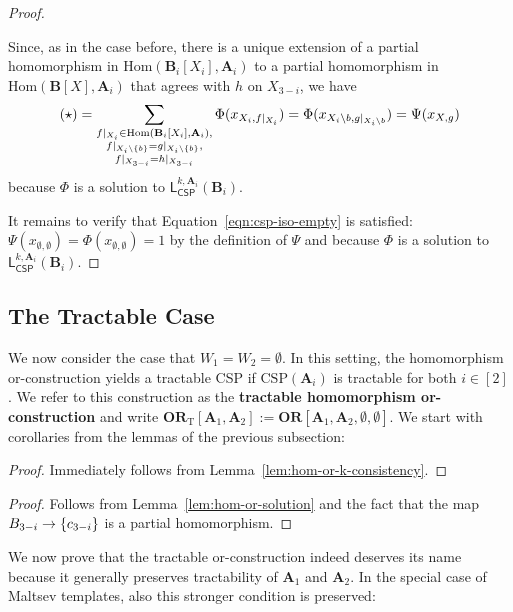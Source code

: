 \documentclass[a4paper,english, thm-restate]{lipics-v2021}
\newcommand{\defining}[1]{\textbf{#1}}
\DeclarePairedDelimiter\set{\lbrace}{\rbrace}
\newcommand{\StructA}{\mathbf{A}}
\newcommand{\StructB}{\mathbf{B}}
\newcommand{\CSP}[1]{\mathrm{CSP}(#1)}
\newcommand{\restrict}[2]{#1|_{#2}}
\newcommand{\Hom}[2]{\mathrm{Hom}(#1,#2)}
\newcommand{\leqs}{\mathsf{L}}
\newcommand{\cspiso}[3]{\leqs^{#1,#2}_{\mathsf{CSP}}(#3)}
\newcommand{\ORparam}[1]{\mathbf{OR}[#1]}
\newcommand{\ORT}[1]{\mathbf{OR}_\text{T}[#1]}
\begin{document}
\begin{proof}
\begin{enumerate}
			Since, as in the case before, there is a unique extension of a partial homomorphism in $\Hom{\StructB_i[X_i]}{\StructA_i}$
			to a partial homomorphism in $\Hom{\StructB[X]}{\StructA_i}$
			that agrees with $h$ on $X_{3-i}$, we have
			\begin{align*}
				(\star) = \sum_{\substack{
						\restrict{f}{X_i} \in \Hom{\StructB_i[X_i]}{\StructA_i},\\
						\restrict{f}{X_i \setminus \set{b} } = \restrict{g}{X_i \setminus \set{b}},\\
						\restrict{f}{X_{3-i}} = \restrict{h}{X_{3-i}}
				}}
				\Phi(x_{X_i,\restrict{f}{X_i}}) =  \Phi(x_{X_i\setminus {b}, \restrict{g}{X_i \setminus {b}}}) = \Psi(x_{X, g})
			\end{align*}
			because $\Phi$ is a solution to $\cspiso{k}{\StructA_i}{\StructB_i}$.
		\end{enumerate}
		It remains to verify that Equation~\ref{eqn:csp-iso-empty} is satisfied: $\Psi(x_{\emptyset,\emptyset}) = \Phi(x_{\emptyset,\emptyset}) = 1$
		by the definition of $\Psi$ and because $\Phi$ is a solution to $\cspiso{k}{\StructA_i}{\StructB_i}$.
	\end{proof}
	
	
	
	
	
	
	\subsection{The Tractable Case}
	\label{app:tractable-or}
	We now consider the case that $W_1=W_2=\emptyset$.
	In this setting, the homomorphism or-construction yields a tractable CSP
	if $\CSP{\StructA_i}$ is tractable for both $i\in[2]$.
	We refer to this construction as the \defining{tractable homomorphism or-construction} and write $\ORT{\StructA_1,\StructA_2} := \ORparam{\StructA_1,\StructA_2,\emptyset,\emptyset}$.
	We start with corollaries from the lemmas of the previous subsection:
	
	
	\homOrTractableKConsistency*
	\begin{proof}
		Immediately follows from Lemma~\ref{lem:hom-or-k-consistency}.
	\end{proof}
	
	\homOrTractableSolution*
	\begin{proof}
		Follows from Lemma~\ref{lem:hom-or-solution}
		and the fact that the map $B_{3-i} \to \set{c_{3-i}}$ is a partial homomorphism.
	\end{proof}
	
	\noindent We now prove that the tractable or-construction indeed deserves its name because it generally preserves tractability of $\StructA_1$ and $\StructA_2$. In the special case of Maltsev templates, also this stronger condition is preserved: 
	
\end{document}
